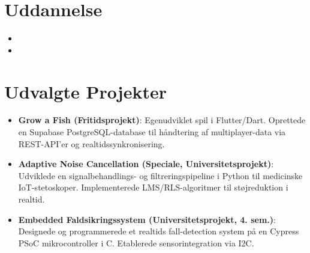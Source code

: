 \documentclass[11pt,a4paper,sans]{moderncv}
\begin{document}
\section{Uddannelse}
\vspace{1pt}
\begin{itemize}

\item{}

\vspace{3pt}

\item{}

\end{itemize}


\section{Udvalgte Projekter}
\vspace{1pt}
\begin{itemize}

\item{\textbf{Grow a Fish (Fritidsprojekt)}: Egenudviklet spil i Flutter/Dart. Oprettede en Supabase PostgreSQL-database til håndtering af multiplayer-data via REST-API'er og realtidssynkronisering.}

\item{\textbf{Adaptive Noise Cancellation (Speciale, Universitetsprojekt)}: Udviklede en signalbehandlings- og filtreringspipeline i Python til medicinske IoT-stetoskoper. Implementerede LMS/RLS-algoritmer til støjreduktion i realtid.}

\item{\textbf{Embedded Faldsikringssystem (Universitetsprojekt, 4. sem.)}: Designede og programmerede et realtids fall-detection system på en Cypress PSoC mikrocontroller i C. Etablerede sensorintegration via I2C.}

\end{itemize}
\end{document}
